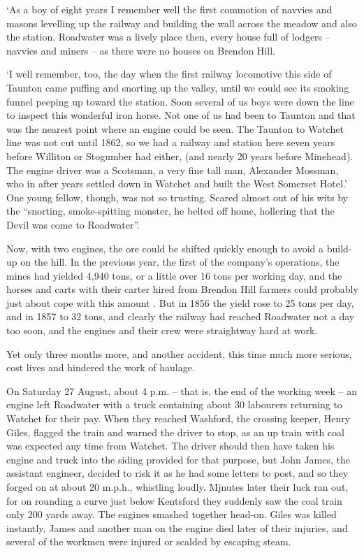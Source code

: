 \documentclass[11pt]{book}
\begin{document}
‘As a boy of eight years I remember well the first commotion of navvies and masons levelling up the railway and building the wall across the meadow and also the station. Roadwater was a lively place then, every house full of lodgers – navvies and miners – as there were no houses on Brendon Hill.

‘I well remember, too, the day when the first railway locomotive this side of Taunton came puffing and snorting up the valley, until we could see its smoking funnel peeping up toward the station. Soon several of us boys were down the line to inspect this wonderful iron horse.  Not one of us had been to Taunton and that was the nearest point where an engine could be seen. The Taunton to Watchet line was not cut until 1862, so we had a railway and station here seven years before Williton or Stogumber had either, (and nearly 20 years before Minehead). The engine driver was a Scotsman, a very fine tall man, Alexander Mossman, who in after years settled down in Watchet and built the West Somerset Hotel.’ One young fellow, though, was not so trusting. Scared almost out of his wits by the “snorting, smoke-spitting monster, he belted off home, hollering that the Devil was come to Roadwater”.

Now, with two engines, the ore could be shifted quickly enough to avoid a build-up on the hill. In the previous year, the first of the company’s operations, the mines had yielded 4,940 tons, or a little over 16 tons per working day, and the horses and carts with their carter hired from Brendon Hill farmers could probably just about cope with this amount . But in 1856 the yield   rose to 25 tons per day, and in 1857 to 32 tons, and clearly the railway had reached Roadwater not a day too soon, and the engines and their crew were straightway hard at work.

Yet only three months more, and another accident, this time much more serious, cost lives and hindered the work of haulage.

On Saturday 27 August, about 4 p.m. – that is, the end of the working week – an engine left Roadwater with a truck containing about 30 labourers returning to Watchet for their pay. When they reached Washford, the crossing keeper, Henry Giles, flagged the train and warned the driver to stop, as an up train with coal was expected any time from Watchet.  The driver should then have taken his engine and truck into the siding provided for that purpose, but John James, the assistant engineer, decided to risk it as he had some letters to post, and so they forged on at about 20 m.p.h., whistling loudly. Mjnutes later their luck ran out, for on rounding a curve just below Kentsford they suddenly saw the coal train only 200 yards away. The engines smashed together head-on. Giles was killed instantly, James and another man on the engine died later of their injuries, and several of the workmen were injured or scalded by escaping steam.
\end{document}
